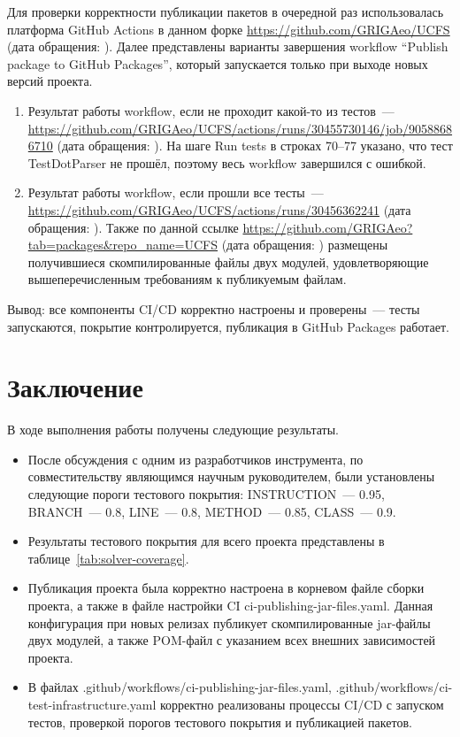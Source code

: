 \documentclass[a4paper]{article}
\begin{document}
Для проверки корректности публикации пакетов в очередной раз использовалась платформа GitHub Actions в данном форке \url{https://github.com/GRIGAeo/UCFS} (дата обращения: ). Далее представлены варианты завершения workflow \foreignquote{english}{Publish package to GitHub Packages}, который запускается только при выходе новых версий проекта.
\begin{enumerate}
    \item Результат работы workflow, если не проходит какой-то из тестов~--- \url{https://github.com/GRIGAeo/UCFS/actions/runs/30455730146/job/90588686710} (дата обращения: ). На шаге Run tests в строках 70--77 указано, что тест TestDotParser не прошёл, поэтому весь workflow завершился с ошибкой.
    \item Результат работы workflow, если прошли все тесты~--- \url{https://github.com/GRIGAeo/UCFS/actions/runs/30456362241} (дата обращения: ). Также по данной ссылке \url{https://github.com/GRIGAeo?tab=packages&repo_name=UCFS} (дата обращения: ) размещены получившиеся скомпилированные файлы двух модулей, удовлетворяющие вышеперечисленным требованиям к публикуемым файлам.
\end{enumerate}

Вывод: все компоненты CI/CD корректно настроены и проверены~--- тесты запускаются, покрытие контролируется, публикация в GitHub Packages работает.

\section{Заключение}

В ходе выполнения работы получены следующие результаты.

\begin{itemize}
    \item После обсуждения с одним из разработчиков инструмента, по совместительству являющимся научным руководителем, были установлены следующие пороги тестового покрытия: INSTRUCTION~--- 0.95, BRANCH~--- 0.8, LINE~--- 0.8, METHOD~--- 0.85, CLASS~--- 0.9.
    \item Результаты тестового покрытия для всего проекта представлены в таблице~\ref{tab:solver-coverage}.
    \item Публикация проекта была корректно настроена в корневом файле сборки проекта, а также в файле настройки CI ci-publishing-jar-files.yaml. Данная конфигурация при новых релизах публикует скомпилированные jar-файлы двух модулей, а также POM-файл с указанием всех внешних зависимостей проекта.
    \item В файлах .github/workflows/ci-publishing-jar-files.yaml, .github/workflows/ci-test-infrastructure.yaml корректно реализованы процессы CI/CD с запуском тестов, проверкой порогов тестового покрытия и публикацией пакетов. 
\end{itemize}
\end{document}
